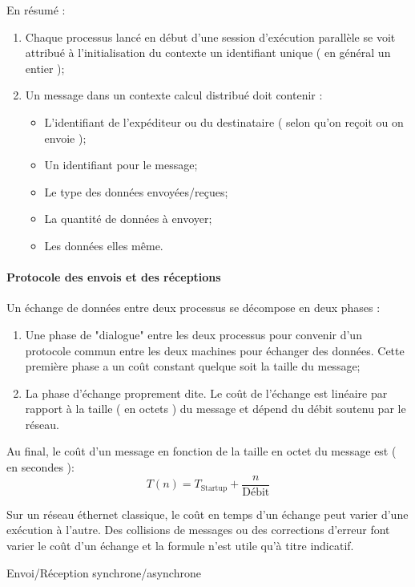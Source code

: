\documentclass[fleqn,11pt]{article}
\begin{document}
En résumé :
\begin{enumerate}
\item Chaque processus lancé en début d'une session d'exécution parallèle se voit
attribué à l'initialisation du contexte un identifiant unique ( en général un entier );
\item Un message dans un contexte calcul distribué doit contenir : 
\begin{itemize}
\item L'identifiant de l'expéditeur ou du destinataire ( selon qu'on reçoit ou on
envoie );
\item Un identifiant pour le message;
\item Le type des données envoyées/reçues;
\item La quantité de données à envoyer;
\item Les données elles même.
\end{itemize}
\end{enumerate}

\paragraph{Protocole des envois et des réceptions}

Un échange de données entre deux processus se décompose en deux phases :
\begin{enumerate}
\item Une phase de "dialogue" entre les deux processus pour convenir d'un
protocole commun entre les deux machines pour échanger des données. Cette
première phase a un coût constant quelque soit la taille du message;
\item La phase d'échange proprement dite. Le coût de l'échange est linéaire
par rapport à la taille ( en octets ) du message et dépend du débit
soutenu par le réseau.
\end{enumerate}

Au final, le coût d'un message en fonction de la taille en octet du message
est ( en secondes ):
\begin{equation}
T(n) = T_{\mbox{Startup}} + \frac{n}{\mbox{Débit}}
\end{equation} 

Sur un réseau éthernet classique, le coût en temps d'un échange peut varier
d'une exécution à l'autre. Des collisions de messages ou des corrections
d'erreur font varier le coût d'un échange et la formule n'est utile
qu'à titre indicatif.

Envoi/Réception synchrone/asynchrone
\end{document}
